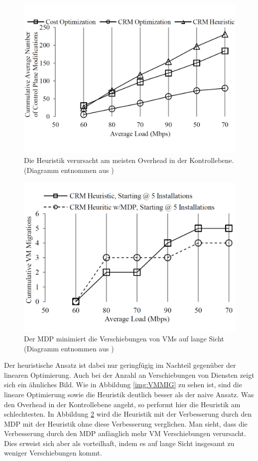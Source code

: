 \documentclass[conference]{IEEEtran}
\begin{document}
\begin{figure}[h]
	\centering
	\includegraphics[trim=0 3cm 0 1cm,scale=0.25]{grafik/CPM.pdf}
	\caption{Die Heuristik verursacht am meisten Overhead in der Kontrollebene.
	(Diagramm entnommen aus \cite{IEEEhowto:orig})}
	\label{img:CPM}
\end{figure}

\begin{figure}[h]
	\centering
	\includegraphics[trim=0 2.5cm 0 1cm,scale=0.25]{grafik/MDP.pdf}
	\caption{Der MDP minimiert die Verschiebungen von VMs auf lange Sicht
	(Diagramm entnommen aus \cite{IEEEhowto:orig})}
	\label{img:MDP}
\end{figure}

Der heuristische Ansatz ist dabei nur geringfügig im Nachteil gegenüber der linearen Optimierung. Auch bei der Anzahl an Verschiebungen von Diensten zeigt sich ein ähnliches Bild.
Wie in Abbildung \ref{img:VMMIG} zu sehen ist, sind die lineare Optimierung sowie die Heuristik deutlich besser als der naive Ansatz.
Was den Overhead in der Kontrollebene angeht, so performt hier die Heuristik am schlechtesten.
In Abbildung \ref{img:MDP} wird die Heuristik mit der Verbesserung durch den MDP mit der Heuristik ohne diese Verbesserung verglichen. Man sieht, dass die Verbesserung durch den MDP  anfänglich mehr VM Verschiebungen verursacht. Dies erweist sich aber als vorteilhaft, indem es auf lange Sicht insgesamt zu weniger Verschiebungen kommt.
\end{document}
